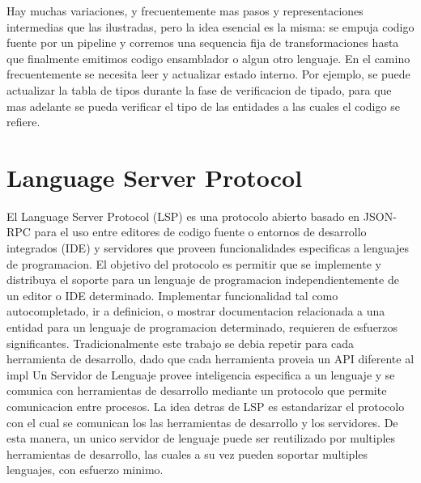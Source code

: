 \documentclass[12pt, a4paper]{report}
\begin{document}
Hay muchas variaciones, y frecuentemente mas pasos y representaciones intermedias que las ilustradas, pero la idea esencial es la misma: se empuja codigo fuente por un pipeline y corremos una sequencia fija de transformaciones hasta que finalmente emitimos codigo ensamblador o algun otro lenguaje.
En el camino frecuentemente se necesita leer y actualizar estado interno.
Por ejemplo, se puede actualizar la tabla de tipos durante la fase de verificacion de tipado, para que mas adelante se pueda verificar el tipo de las entidades a las cuales el codigo se refiere.
\cite{olle_query_based}

\section*{Language Server Protocol}

El Language Server Protocol (LSP) es una protocolo abierto basado en JSON-RPC para el uso entre editores de codigo fuente o entornos de desarrollo integrados (IDE) y servidores que proveen funcionalidades especificas a lenguajes de programacion.
El objetivo del protocolo es permitir que se implemente y distribuya el soporte para un lenguaje de programacion independientemente de un editor o IDE determinado.
Implementar funcionalidad tal como autocompletado, ir a definicion, o mostrar documentacion relacionada a una entidad para un lenguaje de programacion determinado, requieren de esfuerzos significantes.
Tradicionalmente este trabajo se debia repetir para cada herramienta de desarrollo, dado que cada herramienta proveia un API diferente al impl
Un Servidor de Lenguaje provee inteligencia especifica a un lenguaje y se comunica con herramientas de desarrollo mediante un protocolo que permite comunicacion entre procesos.
La idea detras de LSP es estandarizar el protocolo con el cual se comunican los las herramientas de desarrollo y los servidores. De esta manera, un unico servidor de lenguaje puede ser reutilizado por multiples herramientas de desarrollo, las cuales a su vez pueden soportar multiples lenguajes, con esfuerzo minimo.
\cite{language_server_protocol}
\end{document}
